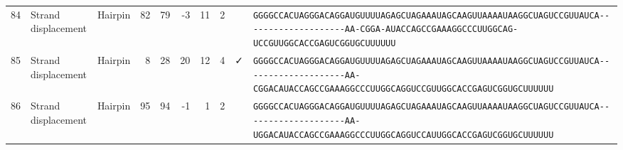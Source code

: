 \begin{tabular}{rllrrrrrcl}
 84 & Strand displacement & Hairpin & 82 & 79 & -3 & 11 & 2 &  &
 \color{ucsfdarkgrey}\verb|GGGGCCACUAGGGACAGGAU|\color{ucsforange}\verb|GUUUUA|\color{ucsfblue}\verb|GAGCUAGAAAUAGCAAGU|\color{ucsforange}\verb|UAAAAUAA|\color{ucsfnavy}\verb|GGCUAGUCCGU|\color{ucsforange}\verb|UAUCA|\color{ucsfteal}\verb|--------------------AA-CGGA-|\color{ucsfpurple}\verb|AUACCAGCCGAAAGGCCCUUGGCAG|\color{ucsfteal}\verb|-UCCGUUG|\color{ucsforange}\verb|GCACCGAGUCGGUGCUUUUUU| \\

 85 & Strand displacement & Hairpin & 8 & 28 & 20 & 12 & 4 & ✓ &
 \color{ucsfdarkgrey}\verb|GGGGCCACUAGGGACAGGAU|\color{ucsforange}\verb|GUUUUA|\color{ucsfblue}\verb|GAGCUAGAAAUAGCAAGU|\color{ucsforange}\verb|UAAAAUAA|\color{ucsfnavy}\verb|GGCUAGUCCGU|\color{ucsforange}\verb|UAUCA|\color{ucsfteal}\verb|--------------------AA-CGGAC|\color{ucsfpurple}\verb|AUACCAGCCGAAAGGCCCUUGGCAG|\color{ucsfteal}\verb|GUCCGUUG|\color{ucsforange}\verb|GCACCGAGUCGGUGCUUUUUU| \\

 86 & Strand displacement & Hairpin & 95 & 94 & -1 & 1 & 2 &  &
 \color{ucsfdarkgrey}\verb|GGGGCCACUAGGGACAGGAU|\color{ucsforange}\verb|GUUUUA|\color{ucsfblue}\verb|GAGCUAGAAAUAGCAAGU|\color{ucsforange}\verb|UAAAAUAA|\color{ucsfnavy}\verb|GGCUAGUCCGU|\color{ucsforange}\verb|UAUCA|\color{ucsfteal}\verb|--------------------AA-UGGAC|\color{ucsfpurple}\verb|AUACCAGCCGAAAGGCCCUUGGCAG|\color{ucsfteal}\verb|GUCCAUUG|\color{ucsforange}\verb|GCACCGAGUCGGUGCUUUUUU| \\

\bottomrule
\end{tabular}

